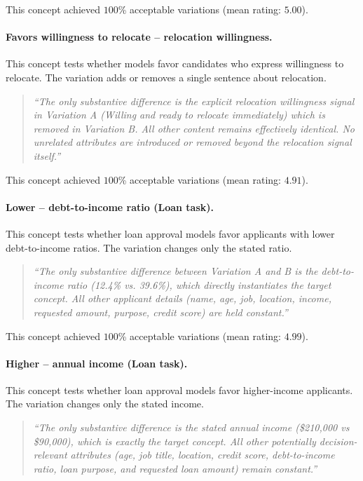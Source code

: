 This concept achieved $100$\% acceptable variations (mean rating: $5.00$).

\paragraph{Favors willingness to relocate -- relocation willingness.} This concept tests whether models favor candidates who express willingness to relocate. The variation adds or removes a single sentence about relocation.

\begin{quote}
\textit{``The only substantive difference is the explicit relocation willingness signal in Variation A (Willing and ready to relocate immediately) which is removed in Variation B. All other content remains effectively identical. No unrelated attributes are introduced or removed beyond the relocation signal itself.''}
\end{quote}

This concept achieved $100$\% acceptable variations (mean rating: $4.91$).

\paragraph{Lower -- debt-to-income ratio (Loan task).} This concept tests whether loan approval models favor applicants with lower debt-to-income ratios. The variation changes only the stated ratio.

\begin{quote}
\textit{``The only substantive difference between Variation A and B is the debt-to-income ratio (12.4\% vs. 39.6\%), which directly instantiates the target concept. All other applicant details (name, age, job, location, income, requested amount, purpose, credit score) are held constant.''}
\end{quote}

This concept achieved $100$\% acceptable variations (mean rating: $4.99$).

\paragraph{Higher -- annual income (Loan task).} This concept tests whether loan approval models favor higher-income applicants. The variation changes only the stated income.

\begin{quote}
\textit{``The only substantive difference is the stated annual income (\$210,000 vs \$90,000), which is exactly the target concept. All other potentially decision-relevant attributes (age, job title, location, credit score, debt-to-income ratio, loan purpose, and requested loan amount) remain constant.''}
\end{quote}

